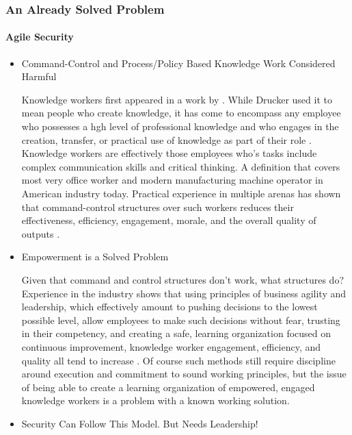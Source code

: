 \begin{frame}
  \frametitle{An Already Solved Problem}
  \framesubtitle{Agile Security}
  \begin{itemize}
    \item<1-> Command-Control and Process/Policy Based Knowledge Work Considered Harmful

           {\tiny{Knowledge workers first appeared in a work by \textcite{druckerManagementProfessionalEmployee1952}. While Drucker used it to mean people who create knowledge, it has come to encompass any employee who possesses a hgh level of professional knowledge and who engages in the creation, transfer, or practical use of knowledge as part of their role \parencite{surawskiWhoKnowledgeWorker2019}. Knowledge workers are effectively those employees who's tasks include complex communication skills and critical thinking. A definition that covers most very office worker and modern manufacturing machine operator in American industry today. Practical experience in multiple arenas has shown that command-control structures over such workers reduces their effectiveness, efficiency, engagement, morale, and the overall quality of outputs \parencite{lencioniFiveDysfunctionsTeam2002,marquetTurnShipTrue2013,abrashoffItYourShip2012}.}}

    \item<2-> Empowerment is a Solved Problem

           {\tiny{Given that command and control structures don't work, what structures do? Experience in the industry shows that using principles of business agility and leadership, which effectively amount to pushing decisions to the lowest possible level, allow employees to make such decisions without fear, trusting in their competency, and creating a safe, learning organization focused on continuous improvement, knowledge worker engagement, efficiency, and quality all tend to increase \parencite{reiferHowGoodAre2002,digital.aiStateAgileSurvey2020}. Of course such methods still require discipline around execution and commitment to sound working principles, but the issue of being able to create a learning organization of empowered, engaged knowledge workers is a problem with a known working solution. }}


    \item<3-> Security Can Follow This Model. But Needs Leadership!


\end{itemize}
\end{frame}
